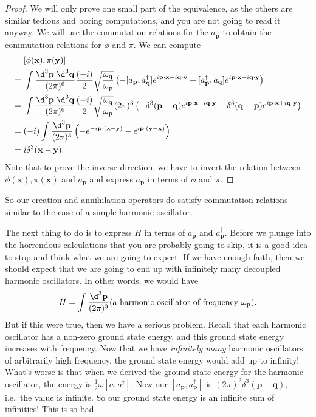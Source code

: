 \documentclass[a4paper]{article}
\begin{document}
\begin{proof}
  We will only prove one small part of the equivalence, as the others are similar tedious and boring computations, and you are not going to read it anyway. We will use the commutation relations for the $a_\mathbf{p}$ to obtain the commutation relations for $\phi$ and $\pi$. We can compute
  \begin{align*}
    &[\phi(\mathbf{x}), \pi(\mathbf{y})]\\
    ={}& \int \frac{\d^3 \mathbf{p}\; \d^3 \mathbf{q}}{(2\pi)^6} \frac{(-i)}{2}\sqrt{\frac{\omega_\mathbf{q}}{\omega_\mathbf{p}}}\left(-[a_\mathbf{p}, a_\mathbf{q}^\dagger] e^{i\mathbf{p} \cdot \mathbf{x} - i \mathbf{q}\cdot \mathbf{y}} + [a_\mathbf{p}^\dagger, a_\mathbf{q}] e^{i\mathbf{p}\cdot \mathbf{x} + i \mathbf{q}\cdot \mathbf{y}}\right)\\
    ={}& \int \frac{\d^3 \mathbf{p}\; \d^3 \mathbf{q}}{(2\pi)^6} \frac{(-i)}{2}\sqrt{\frac{\omega_\mathbf{q}}{\omega_\mathbf{p}}}(2\pi)^3\left(-\delta^3(\mathbf{p} - \mathbf{q}) e^{i\mathbf{p} \cdot \mathbf{x} - i \mathbf{q}\cdot \mathbf{y}} - \delta^3(\mathbf{q} - \mathbf{p}) e^{i\mathbf{p}\cdot \mathbf{x} + i \mathbf{q}\cdot \mathbf{y}}\right)\\
    ={}& (-i) \int \frac{\d^3 \mathbf{p}}{(2\pi)^3} \left(-e^{-i\mathbf{p}\cdot (\mathbf{x} - \mathbf{y})} - e^{i\mathbf{p} \cdot(\mathbf{y} - \mathbf{x})}\right)\\
    ={}& i \delta^3(\mathbf{x} - \mathbf{y}).
  \end{align*}
  Note that to prove the inverse direction, we have to invert the relation between $\phi(\mathbf{x}), \pi(\mathbf{x})$ and $a_\mathbf{p}$ and express $a_\mathbf{p}$ in terms of $\phi$ and $\pi$.
\end{proof}
So our creation and annihilation operators do satisfy commutation relations similar to the case of a simple harmonic oscillator.

The next thing to do is to express $H$ in terms of $a_\mathbf{p}$ and $a_\mathbf{p}^\dagger$. Before we plunge into the horrendous calculations that you are probably going to skip, it is a good idea to stop and think what we are going to expect. If we have enough faith, then we should expect that we are going to end up with infinitely many decoupled harmonic oscillators. In other words, we would have
\[
  H = \int \frac{\d^3 \mathbf{p}}{(2\pi)^3} (\text{a harmonic oscillator of frequency $\omega_\mathbf{p}$}).
\]
But if this were true, then we have a serious problem. Recall that each harmonic oscillator has a non-zero ground state energy, and this ground state energy increases with frequency. Now that we have \emph{infinitely many} harmonic oscillators of arbitrarily high frequency, the ground state energy would add up to infinity! What's worse is that when we derived the ground state energy for the harmonic oscillator, the energy is $\frac{1}{2}\omega [a, a^\dagger]$. Now our $[a_\mathbf{p}, a_\mathbf{p}^\dagger]$ is $(2\pi)^3 \delta^3(\mathbf{p} - \mathbf{q})$, i.e.\ the value is infinite. So our ground state energy is an infinite sum of infinities! This is so bad.
\end{document}
